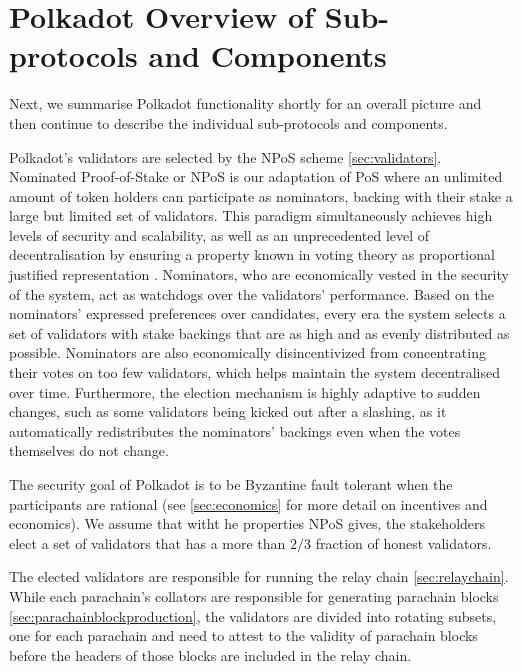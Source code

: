 \section{Polkadot Overview of Sub-protocols and Components}\label{sec:summary}\label{sec:components}
Next, we summarise Polkadot functionality shortly for an overall picture and then continue to describe the individual sub-protocols and components. %

Polkadot's validators are selected by the NPoS scheme \ref{sec:validators}. Nominated Proof-of-Stake or NPoS is our adaptation of PoS where an unlimited amount of token holders can participate as nominators, backing with their stake a large but limited set of validators. This paradigm simultaneously achieves high levels of security and scalability, as well as an unprecedented level of decentralisation by ensuring a property known in voting theory as proportional justified representation \cite{sanchez2017proportional, brill2017phragmen}. Nominators, who are economically vested in the security of the system, act as watchdogs over the validators' performance. Based on the nominators' expressed preferences over candidates, every era the system selects a set of validators with stake backings that are as high and as evenly distributed as possible. Nominators are also economically disincentivized from concentrating their votes on too few validators, which helps maintain the system decentralised over time. Furthermore, the election mechanism is highly adaptive to sudden changes, such as some validators being kicked out after a slashing, as it automatically redistributes the nominators' backings even when the votes themselves do not change. 

The security goal of Polkadot is to be Byzantine fault tolerant when the participants are rational (see \ref{sec:economics} for more detail on incentives and economics). We assume that witht he properties NPoS gives, the stakeholders elect a set of validators that has a more than $2/3$ fraction of honest validators.

The elected validators are responsible for running the relay chain \ref{sec:relaychain}. While each parachain's collators are responsible for generating parachain blocks \ref{sec:parachainblockproduction}, the validators are divided into rotating subsets, one for each parachain and need to attest to the validity of parachain blocks before the headers of those blocks are included in the relay chain.

